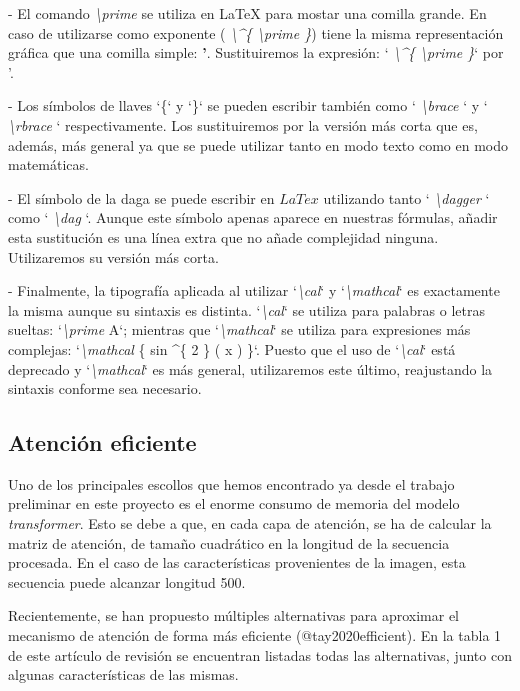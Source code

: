 \documentclass[a4paper, 20pt, dvipsnames]{article}
\begin{document}
- El comando \emph{\textbackslash prime} se utiliza en \LaTeX{} para mostar una comilla grande. En caso de utilizarse como exponente (\emph{ \textbackslash \textasciicircum \{ \textbackslash prime \}}) tiene la misma representación gráfica que una comilla simple: \textbf{'}. Sustituiremos la expresión: `\emph{ \textbackslash \textasciicircum \{ \textbackslash prime \}}` por '.

- Los símbolos de llaves `\{` y `\}` se pueden escribir también como `\emph{ \textbackslash brace }` y `\emph{ \textbackslash rbrace }` respectivamente. Los sustituiremos por la versión más corta que es, además, más general ya que se puede utilizar tanto en modo texto como en modo matemáticas.

- El símbolo de la daga se puede escribir en $LaTex$ utilizando tanto `\emph{ \textbackslash dagger }` como `\emph{ \textbackslash dag }`. Aunque este símbolo apenas aparece en nuestras fórmulas, añadir esta sustitución es una línea extra que no añade complejidad ninguna. Utilizaremos su versión más corta.

- Finalmente, la tipografía aplicada al utilizar `\emph{\textbackslash cal}` y `\emph{\textbackslash mathcal}` es exactamente la misma aunque su sintaxis es distinta. `\emph{\textbackslash cal}` se utiliza para palabras o letras sueltas: `\emph{\textbackslash prime} A`; mientras que `\emph{\textbackslash mathcal}` se utiliza para expresiones más complejas: `\emph{\textbackslash mathcal} \{ sin \textasciicircum \{ 2 \} ( x ) \}`. Puesto que el uso de `\emph{\textbackslash cal}` está deprecado y `\emph{\textbackslash mathcal}` es más general, utilizaremos este último, reajustando la sintaxis conforme sea necesario.


\subsection{Atención eficiente}

Uno de los principales escollos que hemos encontrado ya desde el trabajo preliminar en este proyecto es el enorme consumo de memoria del modelo \emph{transformer}. Esto se debe a que, en cada capa de atención, se ha de calcular la matriz de atención, de tamaño cuadrático en la longitud de la secuencia procesada. En el caso de las características provenientes de la imagen, esta secuencia puede alcanzar longitud 500.

Recientemente, se han propuesto múltiples alternativas para aproximar el mecanismo de atención de forma más eficiente (@tay2020efficient). En la tabla 1 de este artículo de revisión se encuentran listadas todas las alternativas, junto con algunas características de las mismas.
\end{document}
